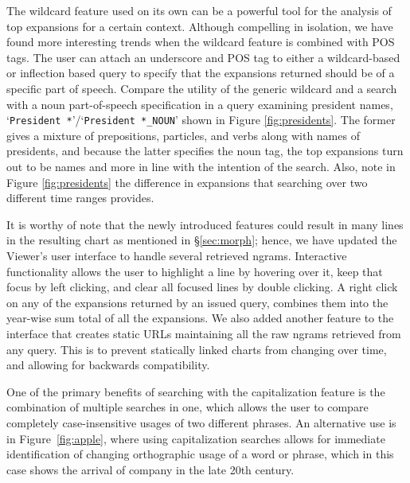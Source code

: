 \documentclass[11pt,a4paper]{article}
\newcommand{\query}[1]{\texttt{#1}}
\begin{document}
The wildcard feature used on its own can be a powerful tool for the analysis of top expansions for a certain context.  Although compelling in isolation, we have found more interesting trends when the wildcard feature is combined with POS tags. The user can attach an underscore and POS tag to either a wildcard-based or inflection based query to specify that the expansions returned should be of a specific part of speech. Compare the utility of the generic wildcard and a search with a noun part-of-speech specification in a query examining president names, `\query{President *}'/`\query{President *\_NOUN}' shown in Figure \ref{fig:presidents}. The former gives a mixture of prepositions, particles, and verbs along with names of presidents, and because the latter specifies the noun tag, the top expansions turn out to be names and more in line with the intention of the search. Also, note in Figure \ref{fig:presidents} the difference in expansions that searching over two different time ranges provides.

It is worthy of note that the newly introduced features could result in many lines in the resulting chart as mentioned in \S\ref{sec:morph}; hence, we have updated the Viewer's user interface to handle several retrieved ngrams. Interactive functionality allows the user to highlight a line by hovering over it, keep that focus by left clicking, and clear all focused lines by double clicking. A right click on any of the expansions returned by an issued query, combines them into the year-wise sum total of all the expansions. We also added another feature to the interface that creates static URLs maintaining all the raw ngrams retrieved from any query. This is to prevent statically linked charts from changing over time, and allowing for backwards compatibility.

One of the primary benefits of searching with the capitalization feature is the combination of multiple searches in one, which allows the user to compare completely case-insensitive usages of two different phrases. An alternative use is in Figure~\ref{fig:apple}, where using capitalization searches allows for immediate identification of changing orthographic usage of a word or phrase, which in this case shows the arrival of company in the late 20th century.
\end{document}

